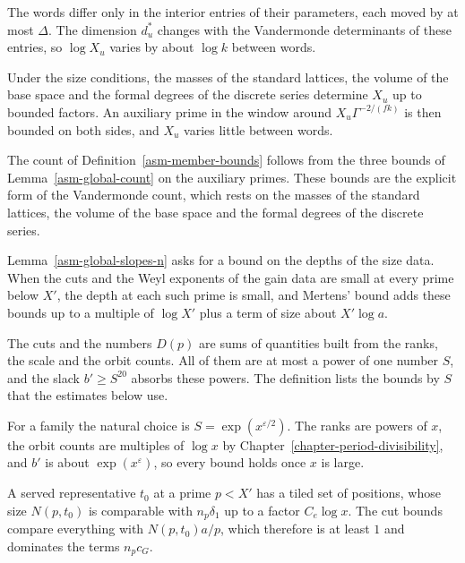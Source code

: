 The words differ only in the interior entries of their parameters, each moved
by at most $\Delta$. The dimension $d^*_u$ changes with the Vandermonde
determinants of these entries, so $\log X_u$ varies by about $\log k$ between
words.

Under the size conditions, the masses of the standard lattices, the volume of
the base space and the formal degrees of the discrete series determine $X_u$ up
to bounded factors. An auxiliary prime in the window around
$X_u\Gamma^{-2/(fk)}$ is then bounded on both sides, and $X_u$ varies little
between words.

The count of Definition~\ref{asm-member-bounds} follows from the three bounds
of Lemma~\ref{asm-global-count} on the auxiliary primes. These bounds are the
explicit form of the Vandermonde count, which rests on the masses of the
standard lattices, the volume of the base space and the formal degrees of the
discrete series.

Lemma~\ref{asm-global-slopes-n} asks for a bound on the depths of the size
data. When the cuts and the Weyl exponents of the gain data are small at every
prime below $X'$, the depth at each such prime is small, and Mertens' bound
adds these bounds up to a multiple of $\log X'$ plus a term of size about
$X'\log a$.

The cuts and the numbers $D(p)$ are sums of quantities built from the ranks,
the scale and the orbit counts. All of them are at most a power of one number
$S$, and the slack $b'\ge S^{20}$ absorbs these powers. The definition lists
the bounds by $S$ that the estimates below use.

For a family the natural choice is $S=\exp(x^{\varepsilon/2})$. The ranks are
powers of $x$, the orbit counts are multiples of $\log x$ by
Chapter~\ref{chapter-period-divisibility}, and $b'$ is about
$\exp(x^{\varepsilon})$, so every bound holds once $x$ is large.

A served representative $t_0$ at a prime $p<X'$ has a tiled set of positions,
whose size $N(p,t_0)$ is comparable with $n_p\delta_1$ up to a factor
$C_e\log x$. The cut bounds compare everything with $N(p,t_0)a/p$, which
therefore is at least $1$ and dominates the terms $n_pc_G$.


